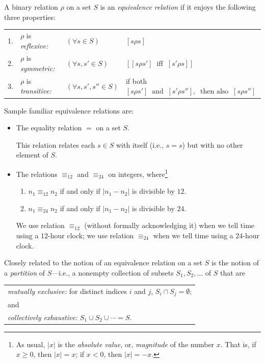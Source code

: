 A binary relation $\rho$ on a set $S$ is an {\it equivalence relation}
  
if it enjoys the following three properties:

\medskip

\begin{tabular}{llll}
1. &
$\rho$ is {\em reflexive:}
   & $(\forall s \in S)$ & $[s \rho s]$ \\
2. &
$\rho$ is {\em symmetric:}
   & $(\forall s, s' \in S)$ 
& $\left[ [s \rho s'] \ \mbox{ iff } \ [s' \rho s] \right]$ \\
3. &
$\rho$ is {\em transitive:}
   & $(\forall s, s', s'' \in S)$ & if both \
$[s \rho s'] \ \mbox{ and } \ [s' \rho s''], \ \mbox{ then also } \ [s \rho s'']$
\end{tabular}

\medskip

\noindent
Sample familiar  equivalence relations are:
\begin{itemize}
\item
The equality relation $=$ on a set $S$.

This relation relates each $s \in S$ with itself (i.e., $s=s$) but
with no other element of $S$.

\item
The relations $\equiv_{12}$ and $\equiv_{24}$ on integers,
where\footnote{As usual, $|x|$ is the {\em absolute value}, or, {\em
    magnitude} of the number $x$.  That is, if $x \geq 0$, then $|x| =
  x$; if $x < 0$, then $|x| = -x$.}
  \begin{enumerate}
  \item
$n_1 \equiv_{12} n_2$ if and only if $|n_1 - n_2|$ is divisible by
$12$.
  \item
$n_1 \equiv_{24} n_2$ if and only if $|n_1 - n_2|$ is divisible by
$24$.
  \end{enumerate}
We use relation $\equiv_{12}$ (without formally acknowledging it) when
we tell time using a $12$-hour clock; we use relation $\equiv_{24}$
when we tell time using a $24$-hour clock.
\end{itemize}

\noindent
Closely related to the notion of an equivalence relation on a set $S$
is the notion of a {\it partition} \index{partition}
 of $S$---i.e., a nonempty collection of subsets
$S_1, S_2, \ldots$ of $S$ that are

\smallskip

\begin{tabular}{l}
{\em mutually exclusive:}
for distinct indices $i$ and $j$, $S_i \cap S_j = \emptyset$; \\
and  \\
{\em collectively exhaustive:}
$S_1 \cup S_2 \cup \cdots = S$.
\end{tabular}

